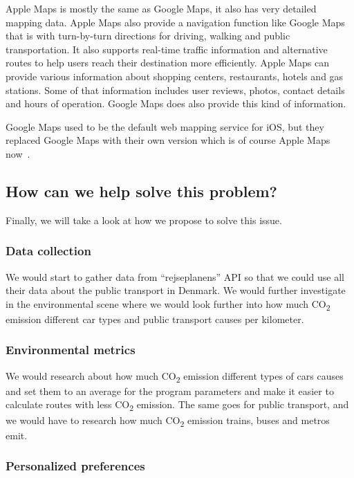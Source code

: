 Apple Maps is mostly the same as Google Maps, it also has very detailed mapping data.
Apple Maps also provide a navigation function like Google Maps that is with turn-by-turn directions for driving, walking
and public transportation.
It also supports real-time traffic information and alternative routes to help users reach their destination more
efficiently.
Apple Maps can provide various information about shopping centers, restaurants, hotels and gas stations.
Some of that information includes user reviews, photos, contact details and hours of operation.
Google Maps does also provide this kind of information.

Google Maps used to be the default web mapping service for iOS, but they replaced Google Maps with their own version
which is of course Apple Maps now~\cite{applemaps2023}.

\subsection{How can we help solve this problem?}\label{subsec:how-can-we-help-solve-this-problem?}

Finally, we will take a look at how we propose to solve this issue.

\subsubsection{Data collection}

We would start to gather data from ``rejseplanens'' API so that we could use all their data about the public transport
in Denmark.
We would further investigate in the environmental scene where we would look further into how much \unit{CO_{2}} emission
different car types and public transport causes per kilometer.

\subsubsection{Environmental metrics}

We would research about how much \unit{CO_{2}} emission different types of cars causes and set them to an average for
the program parameters and make it easier to calculate routes with less \unit{CO_{2}} emission.
The same goes for public transport, and we would have to research how much \unit{CO_{2}} emission trains, buses and
metros emit.

\subsubsection{Personalized preferences}

